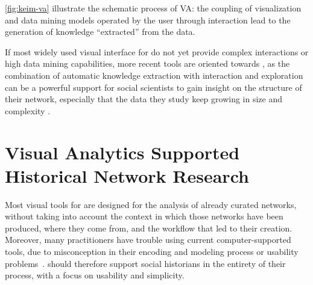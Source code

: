 \autoref{fig:keim-va} illustrate the schematic process of VA: the coupling of visualization and data mining models operated by the user through interaction lead to the generation of knowledge ``extracted'' from the data.

If most widely used visual interface for \hsna do not yet provide complex interactions or high data mining capabilities, more recent tools are oriented towards \va, as the combination of automatic knowledge extraction with interaction and exploration can be a powerful support for social scientists to gain insight on the structure of their network, especially that the data they study keep growing in size and complexity \cite{kaplanVeniceTimeMachine2015}.





\section{Visual Analytics Supported Historical Network Research}\label{sec:intro-HSNV}

Most visual tools for \sna are designed for the analysis of already curated networks, without taking into account the context in which those networks have been produced, where they come from, and the workflow that led to their creation.
Moreover, many practitioners have trouble using current computer-supported tools, due to misconception in their encoding and modeling process or usability problems~\cite{alkadi2022}.
\va should therefore support social historians in the entirety of their process, with a focus on usability and simplicity.


